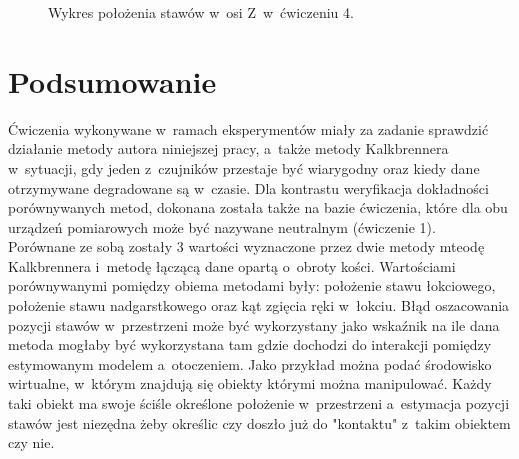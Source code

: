 \begin{figure}[!htb]
	\centering
	\caption{Wykres położenia stawów w~osi Z~w~ćwiczeniu 4.}	
	\label{fig:experiments:four:Zaxis}
\end{figure}

\section{Podsumowanie}

Ćwiczenia wykonywane w~ramach eksperymentów miały za zadanie sprawdzić działanie metody autora niniejszej pracy, a~także metody Kalkbrennera w~sytuacji, gdy jeden z~czujników przestaje być wiarygodny oraz kiedy dane otrzymywane degradowane są w~czasie. Dla kontrastu weryfikacja dokładności porównywanych metod, dokonana została także na bazie ćwiczenia, które dla obu urządzeń pomiarowych może być nazywane neutralnym (ćwiczenie 1).\\

Porównane ze sobą zostały 3 wartości wyznaczone przez dwie metody mteodę Kalkbrennera i~metodę łączącą dane opartą o~obroty kości. Wartościami porównywanymi pomiędzy obiema metodami były: położenie stawu łokciowego, położenie stawu nadgarstkowego oraz kąt zgięcia ręki w~łokciu. 
Błąd oszacowania pozycji stawów w~przestrzeni może być wykorzystany jako wskaźnik na ile dana metoda mogłaby być wykorzystana tam gdzie dochodzi do interakcji pomiędzy estymowanym modelem a~otoczeniem. Jako przykład można podać środowisko wirtualne, w~którym znajdują się obiekty którymi można manipulować. Każdy taki obiekt ma swoje ściśle określone położenie w~przestrzeni a~estymacja pozycji stawów jest niezędna żeby określic czy doszło już do "kontaktu" z~takim obiektem czy nie.
 
